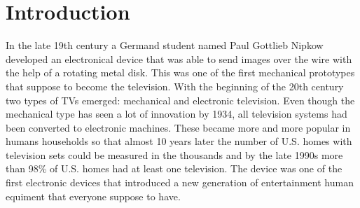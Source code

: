 %

\chapter{Introduction\label{cha:introduction}}

In the late 19th century a Germand student named Paul Gottlieb Nipkow developed an electronical device
that was able to send images over the wire with the help of a rotating metal disk. This was one of the first
mechanical prototypes that suppose to become the television. With the beginning of the 20th century two types
of TVs emerged: mechanical and electronic television. Even though the mechanical type has seen a lot of
innovation by 1934, all television systems had been converted to electronic machines. These became more and
more popular in humans households so that almost 10 years later the number of U.S. homes with television sets
could be measured in the thousands and by the late 1990s more than 98\% of U.S. homes had at least one
television. The device was one of the first electronic devices that introduced a new generation of entertainment
human equiment that everyone suppose to have.

